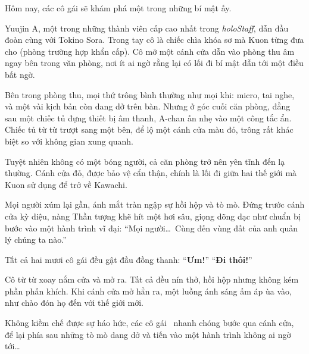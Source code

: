\documentclass[../main.tex]{subfiles}
\begin{document}
Hôm nay, các cô gái sẽ khám phá một trong những bí mật ấy.

Yuujin A, một trong những thành viên cấp cao nhất trong \textit{holoStaff}, dẫn đầu đoàn cùng với Tokino Sora. Trong tay cô là chiếc chìa khóa sơ mà Kuon từng đưa cho (phòng trường hợp khẩn cấp). Cô mở một cánh cửa dẫn vào phòng thu âm ngay bên trong văn phòng, nơi ít ai ngờ rằng lại có lối đi bí mật dẫn tới một điều bất ngờ.

Bên trong phòng thu, mọi thứ trông bình thường như mọi khi: micro, tai nghe, và một vài kịch bản còn dang dở trên bàn. Nhưng ở góc cuối căn phòng, đằng sau một chiếc tủ đựng thiết bị âm thanh, A-chan ấn nhẹ vào một công tắc ẩn. Chiếc tủ từ từ trượt sang một bên, để lộ một cánh cửa màu đỏ, trông rất khác biệt so với không gian xung quanh.

Tuyệt nhiên không có một bóng người, cả căn phòng trở nên yên tĩnh đến lạ thường. Cánh cửa đỏ, được bảo vệ cẩn thận, chính là lối đi giữa hai thế giới mà Kuon sử dụng để trở về Kawachi.

Mọi người xúm lại gần, ánh mắt tràn ngập sự hồi hộp và tò mò. Đứng trước cánh cửa kỳ diệu, nàng Thần tượng khẽ hít một hơi sâu, giọng dõng dạc như chuẩn bị bước vào một hành trình vĩ đại: ``Mọi người\dots\ Cùng đến vùng đất của anh quản lý chúng ta nào.''

Tất cả hai mươi cô gái đều gật đầu đồng thanh: ``\textbf{Ưm!}'' ``\textbf{Đi thôi!}''

Cô từ từ xoay nắm cửa và mở ra. Tất cả đều nín thở, hồi hộp nhưng không kém phần phấn khích. Khi cánh cửa mở hẳn ra, một luồng ánh sáng ấm áp ùa vào, như chào đón họ đến với thế giới mới.

Không kiềm chế được sự háo hức, các cô gái \hll\ nhanh chóng bước qua cánh cửa, để lại phía sau những tò mò dang dở và tiến vào một hành trình không ai ngờ tới\dots
\end{document}

